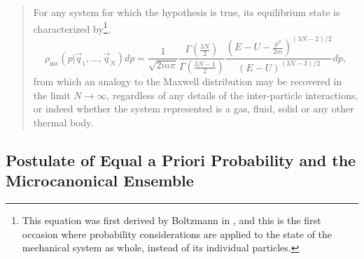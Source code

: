 \begin{quote}
For any system for which the hypothesis is true, its equilibrium state is characterized by\footnote{This equation was first derived by Boltzmann in \cite{boltzmann_uber_1866}, and this is the first occasion where probability considerations are applied to the state of the mechanical system as whole, instead of its individual particles.},
\begin{equation}
\rho_{\mathrm{mc}}\left(p | \vec{q}_{1}, \ldots, \vec{q}_{N}\right) d p=\frac{1}{\sqrt{2 m \pi}} \frac{\Gamma\left(\frac{3N}{2}\right)}{\Gamma\left(\frac{3N-1}{2}\right)} \frac{\left(E-U-\frac{p^{2}}{2 m}\right)^{(3N-2) / 2}}{(E-U)^{(3N-3) / 2}} d p,
\end{equation}
from which an analogy to the Maxwell distribution may be recovered in the limit $N \to \infty$, regardless of any details of the inter-particle interactions, or indeed whether the system represented is a gas, fluid, solid or any other thermal body.
\end{quote}

\subsection{Postulate of Equal a Priori Probability and the Microcanonical Ensemble}

